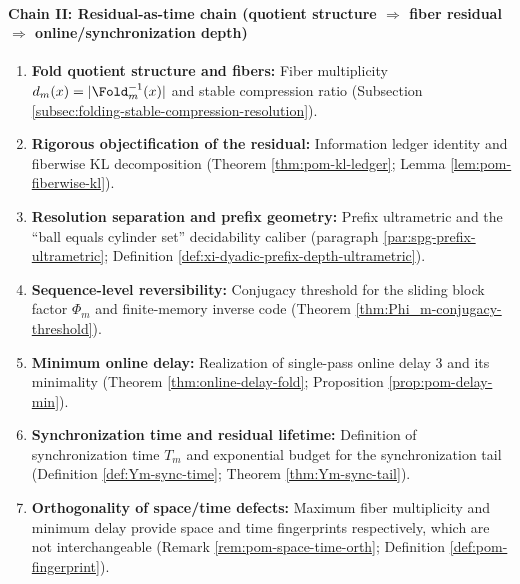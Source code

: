 \paragraph{Chain II: Residual-as-time chain (quotient structure \texorpdfstring{$\Rightarrow$}{=>} fiber residual \texorpdfstring{$\Rightarrow$}{=>} online/synchronization depth)}
\begin{enumerate}
  \item \textbf{Fold quotient structure and fibers:} Fiber multiplicity \(d_m(x)=|\Fold_m^{-1}(x)|\) and stable compression ratio (Subsection \ref{subsec:folding-stable-compression-resolution}).
  \item \textbf{Rigorous objectification of the residual:} Information ledger identity and fiberwise KL decomposition (Theorem \ref{thm:pom-kl-ledger}; Lemma \ref{lem:pom-fiberwise-kl}).
  \item \textbf{Resolution separation and prefix geometry:} Prefix ultrametric and the ``ball equals cylinder set'' decidability caliber (paragraph \ref{par:spg-prefix-ultrametric}; Definition \ref{def:xi-dyadic-prefix-depth-ultrametric}).
  \item \textbf{Sequence-level reversibility:} Conjugacy threshold for the sliding block factor \(\Phi_m\) and finite-memory inverse code (Theorem \ref{thm:Phi_m-conjugacy-threshold}).
  \item \textbf{Minimum online delay:} Realization of single-pass online delay 3 and its minimality (Theorem \ref{thm:online-delay-fold}; Proposition \ref{prop:pom-delay-min}).
  \item \textbf{Synchronization time and residual lifetime:} Definition of synchronization time \(T_m\) and exponential budget for the synchronization tail (Definition \ref{def:Ym-sync-time}; Theorem \ref{thm:Ym-sync-tail}).
  \item \textbf{Orthogonality of space/time defects:} Maximum fiber multiplicity and minimum delay provide space and time fingerprints respectively, which are not interchangeable (Remark \ref{rem:pom-space-time-orth}; Definition \ref{def:pom-fingerprint}).
\end{enumerate}


